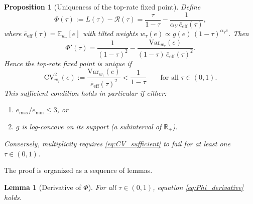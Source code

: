 \documentclass[12pt,a4paper]{article}
\theoremstyle{definition}
\theoremstyle{plain}
\newtheorem{proposition}{Proposition}[section]
\newtheorem{lemma}{Lemma}[section]
\theoremstyle{remark}
\newcommand{\R}{\mathbb{R}}
\newcommand{\E}{\mathbb{E}}
\newcommand{\calR}{\mathcal{R}}
\begin{document}

\begin{proposition}[Uniqueness of the top-rate fixed point]
\label{prop:uniqueness}
Define
\[
  \Phi(\tau)
  := L(\tau) - \calR(\tau)
  = \frac{\tau}{1-\tau}
    - \frac{1}{\alpha_Y\,\bar{e}_{\mathrm{eff}}(\tau)},
\]
where $\bar{e}_{\mathrm{eff}}(\tau) = \E_{w_\tau}[e]$ with
tilted weights
$w_\tau(e) \propto g(e)\,(1-\tau)^{\alpha_Y e}$.
Then
\begin{equation}
\label{eq:Phi_derivative}
  \Phi'(\tau)
  = \frac{1}{(1-\tau)^2}
    - \frac{\mathrm{Var}_{w_\tau}(e)}
           {(1-\tau)\,\bar{e}_{\mathrm{eff}}(\tau)^2}.
\end{equation}
Hence the top-rate fixed point is unique if
\begin{equation}
\label{eq:CV_sufficient}
  \mathrm{CV}^2_{w_\tau}(e)
  := \frac{\mathrm{Var}_{w_\tau}(e)}{\bar{e}_{\mathrm{eff}}(\tau)^2}
  < \frac{1}{1-\tau}
  \qquad \text{for all } \tau \in (0,1).
\end{equation}
This sufficient condition holds in particular if either:
\begin{enumerate}[label=(\alph*)]
  \item $e_{\max}/e_{\min} \leq 3$, or
  \item $g$ is log-concave on its support (a subinterval of $\R_+$).
\end{enumerate}
Conversely, multiplicity requires \eqref{eq:CV_sufficient} to
fail for at least one $\tau \in (0,1)$.
\end{proposition}

The proof is organized as a sequence of lemmas.


\begin{lemma}[Derivative of $\Phi$]
\label{lem:Phi_derivative}
For all $\tau \in (0,1)$, equation \eqref{eq:Phi_derivative}
holds.
\end{lemma}
\end{document}
